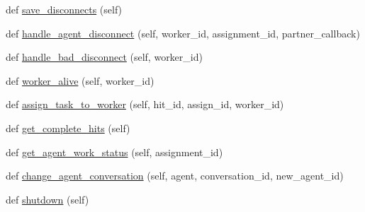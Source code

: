 \begin{DoxyCompactItemize}
\item 
def \hyperlink{classparlai_1_1mturk_1_1core_1_1worker__manager_1_1WorkerManager_ad5ea6d1d764743de25c71d027d6f981c}{save\+\_\+disconnects} (self)
\item 
def \hyperlink{classparlai_1_1mturk_1_1core_1_1worker__manager_1_1WorkerManager_a26f5469b17d425d52277f50b59e611f1}{handle\+\_\+agent\+\_\+disconnect} (self, worker\+\_\+id, assignment\+\_\+id, partner\+\_\+callback)
\item 
def \hyperlink{classparlai_1_1mturk_1_1core_1_1worker__manager_1_1WorkerManager_ac75275d1b201b5bcbd8f23740b4e1080}{handle\+\_\+bad\+\_\+disconnect} (self, worker\+\_\+id)
\item 
def \hyperlink{classparlai_1_1mturk_1_1core_1_1worker__manager_1_1WorkerManager_ae07d1e801e6436a33d2a19f32e41088a}{worker\+\_\+alive} (self, worker\+\_\+id)
\item 
def \hyperlink{classparlai_1_1mturk_1_1core_1_1worker__manager_1_1WorkerManager_a1d5d674e56ea539d50051012780572b5}{assign\+\_\+task\+\_\+to\+\_\+worker} (self, hit\+\_\+id, assign\+\_\+id, worker\+\_\+id)
\item 
def \hyperlink{classparlai_1_1mturk_1_1core_1_1worker__manager_1_1WorkerManager_a451312cbfad4b059777195ffcdbc0410}{get\+\_\+complete\+\_\+hits} (self)
\item 
def \hyperlink{classparlai_1_1mturk_1_1core_1_1worker__manager_1_1WorkerManager_add7bab97c8116b679d516564c9cf0f6d}{get\+\_\+agent\+\_\+work\+\_\+status} (self, assignment\+\_\+id)
\item 
def \hyperlink{classparlai_1_1mturk_1_1core_1_1worker__manager_1_1WorkerManager_aa140d322d7237605580f5162a437e0ba}{change\+\_\+agent\+\_\+conversation} (self, agent, conversation\+\_\+id, new\+\_\+agent\+\_\+id)
\item 
def \hyperlink{classparlai_1_1mturk_1_1core_1_1worker__manager_1_1WorkerManager_a814ac330b709eeef4abf4e4a73d71447}{shutdown} (self)
\end{DoxyCompactItemize}

